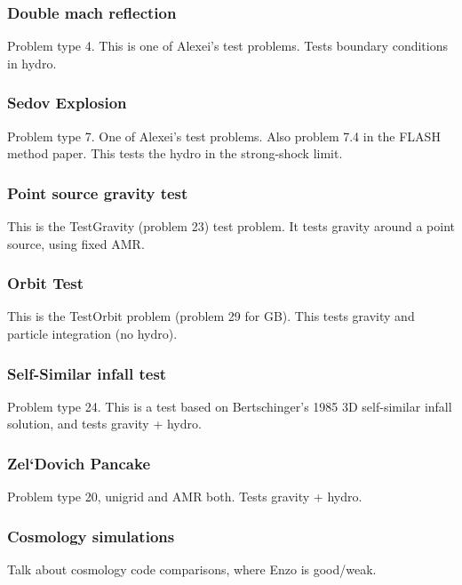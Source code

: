 \subsubsection{Double mach reflection}
\label{sec.tests.doublemach}
Problem type 4.  This is one of Alexei's test problems.  Tests
boundary conditions in hydro.

\subsubsection{Sedov Explosion}
\label{sec.tests.sedov}
Problem type 7.  One of Alexei's test problems.  
Also problem 7.4 in the FLASH method paper.
This tests the hydro in the strong-shock limit.

\subsubsection{Point source gravity test}
\label{sec.test.gravitypointsource}
This is the TestGravity (problem 23) test problem.  It tests gravity around a point source, using fixed AMR.

\subsubsection{Orbit Test}
\label{sec.test.testorbit}
This is the TestOrbit problem (problem 29 for GB).  This tests gravity and particle integration (no hydro).

\subsubsection{Self-Similar infall test}
\label{sec.tests.infall}
Problem type 24.  This is a test based on Bertschinger's 1985 3D self-similar infall
solution, and tests gravity + hydro.

\subsubsection{Zel`Dovich Pancake}
\label{sec.tests.pancake}
Problem type 20, unigrid and AMR both.  Tests gravity + hydro.

\subsubsection{Cosmology simulations}
\label{sec.tests.}
Talk about cosmology code comparisons, where Enzo is good/weak.


